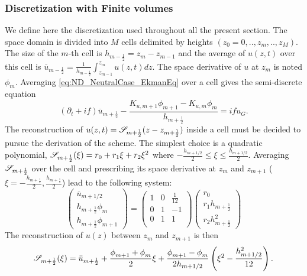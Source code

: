 \subsubsection{Discretization with Finite volumes}
We define here the discretization used throughout all the present
section. The space domain is divided into $M$ cells delimited by
heights $(z_0=0, .., z_m, .., z_M)$. The size of the $m$-th cell
is $h_{m-\frac{1}{2}}=z_{m}-z_{m-1}$ and the average of $u(z, t)$
over this cell is 
$\overline{u}_{m-\frac{1}{2}}=\frac{1} {h_{m-\frac{1}{2}}}
\int_{z_{m-1}}^{z_m}u(z, t)dz$.
The space derivative of $u$ at $z_m$ is noted $\phi_{m}$.
Averaging \eqref{eq:ND_NeutralCase_EkmanEq} over a cell gives
the semi-discrete equation
\begin{equation}
\label{eq:ND_NeutralCase_semiDiscreteEkmanEq}
	(\partial_t + if) \overline{u}_{m+\frac{1}{2}} - 
	\frac{K_{u, m+1} \phi_{m+1} - K_{u, m} \phi_{m}}
		{h_{m+\frac{1}{2}}} = i f u_G.
\end{equation}
The reconstruction of $u(z, t) = {\cal S}_{m+\frac{1}{2}}
				(z - z_{m+\frac{1}{2}})$
				inside a cell must be decided
to pursue the derivation of the scheme. The simplest choice is
a quadratic polynomial,
${\cal S}_{m+\frac{1}{2}}(\xi) = r_0 + r_1 \xi + r_2 \xi^2$ where
$-\frac{h_{m+1/2}}{2} \leq \xi \leq \frac{h_{m+1/2}}{2}$.
Averaging ${\cal S}_{m+\frac{1}{2}}$ over the cell and
prescribing its space derivative at $z_{m}$ and $z_{m+1}$
($\xi=-\frac{h_{m+\frac{1}{2}}}{2}, \frac{h_{m+\frac{1}{2}}}{2}$)
lead to the following system:
\begin{equation}
    \begin{pmatrix}
    \overline{u}_{m+1/2} \\
    h_{m+\frac{1}{2}} \phi_m \\
	    h_{m+\frac{1}{2}} \phi_{m+1}
    \end{pmatrix} = 
    \begin{pmatrix}
    1 & 0 & \frac{1}{12} \\
    0 & 1 & -1 \\
    0 & 1 & 1 \\
    \end{pmatrix}
    \begin{pmatrix}
    r_0 \\
    r_1 h_{m+\frac{1}{2}} \\
    r_2 h_{m+\frac{1}{2}}^2
    \end{pmatrix}
\end{equation}
The reconstruction of $u(z)$ between $z_m$ and $z_{m+1}$
is then
\begin{equation}
\label{eq:ND_NeutralCase_quadraticReconstruction}
{\cal S}_{m+\frac{1}{2}}(\xi) =
	\Bar{u}_{m+\frac{1}{2}} + 
	\frac{\phi_{m+1}^{} + \phi_{m}^{}}{2} \xi
	+ \frac{\phi_{m+1}^{} - \phi_{m}^{}}{2h_{m+1/2}}
	\left(\xi^2 - \frac{h_{m+1/2}^2}{12}\right).
\end{equation}


